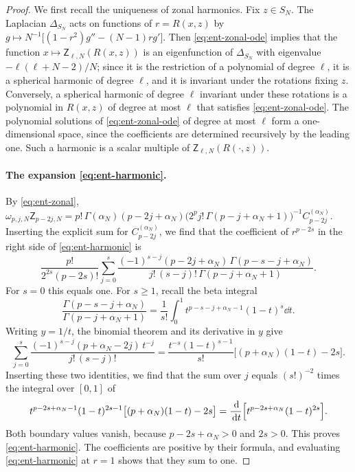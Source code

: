 \begin{proof}
We first recall the uniqueness of zonal harmonics. Fix $z\in S_N$. The
Laplacian $\Delta_{S_N}$ acts on functions of $r=R(x,z)$ by
$g\mapsto N^{-1}\bigl[(1-r^2)g''-(N-1)rg'\bigr]$. Then
\eqref{eq:ent-zonal-ode} implies that the function $x\mapsto\mathsf Z_{\ell,N}(R(x,z))$
is an eigenfunction of $\Delta_{S_N}$ with eigenvalue
$-\ell(\ell+N-2)/N$; since it is the restriction of a polynomial of degree
$\ell$, it is a spherical harmonic of degree $\ell$, and it is invariant
under the rotations fixing $z$. Conversely, a spherical harmonic of degree
$\ell$ invariant under these rotations is a polynomial in $R(x,z)$ of degree
at most $\ell$ that satisfies \eqref{eq:ent-zonal-ode}. The polynomial
solutions of \eqref{eq:ent-zonal-ode} of degree at most $\ell$ form a
one-dimensional space, since the coefficients are determined recursively by
the leading one. Such a harmonic is a scalar multiple of
$\mathsf Z_{\ell,N}(R(\cdot,z))$.

\paragraph{The expansion \eqref{eq:ent-harmonic}.}
By \eqref{eq:ent-zonal},
$\omega_{p,j,N}\mathsf Z_{p-2j,N}=p!\,\Gamma(\alpha_N)(p-2j+\alpha_N)
\bigl(2^pj!\,\Gamma(p-j+\alpha_N+1)\bigr)^{-1}C^{(\alpha_N)}_{p-2j}$.
Inserting the explicit sum for $C^{(\alpha_N)}_{p-2j}$, we find that the
coefficient of $r^{p-2s}$ in the right side of \eqref{eq:ent-harmonic} is
\[
 \frac{p!}{2^{2s}(p-2s)!}\sum_{j=0}^{s}
 \frac{(-1)^{s-j}(p-2j+\alpha_N)\,\Gamma(p-s-j+\alpha_N)}
 {j!\,(s-j)!\,\Gamma(p-j+\alpha_N+1)}.
\]
For $s=0$ this equals one. For $s\ge1$, recall the beta integral
\[
 \frac{\Gamma(p-s-j+\alpha_N)}{\Gamma(p-j+\alpha_N+1)}
 =\frac1{s!}\int_0^1t^{p-s-j+\alpha_N-1}(1-t)^s\dd t .
\]
Writing $y=1/t$, the binomial theorem and its derivative in $y$ give
\[
 \sum_{j=0}^s\frac{(-1)^{s-j}(p+\alpha_N-2j)\,t^{-j}}{j!\,(s-j)!}
 =\frac{t^{-s}(1-t)^{s-1}}{s!}\bigl[(p+\alpha_N)(1-t)-2s\bigr].
\]
Inserting these two identities, we find that the sum over $j$ equals
$(s!)^{-2}$ times the integral over $[0,1]$ of
\[
 t^{p-2s+\alpha_N-1}(1-t)^{2s-1}\bigl[(p+\alpha_N)(1-t)-2s\bigr]
 =\frac{\,\mathrm d}{\,\mathrm d t}\Bigl[t^{p-2s+\alpha_N}(1-t)^{2s}\Bigr].
\]
Both boundary values vanish, because $p-2s+\alpha_N>0$ and $2s>0$. This
proves \eqref{eq:ent-harmonic}. The coefficients are positive by their
formula, and evaluating \eqref{eq:ent-harmonic} at $r=1$ shows that they sum
to one.


\end{proof}
